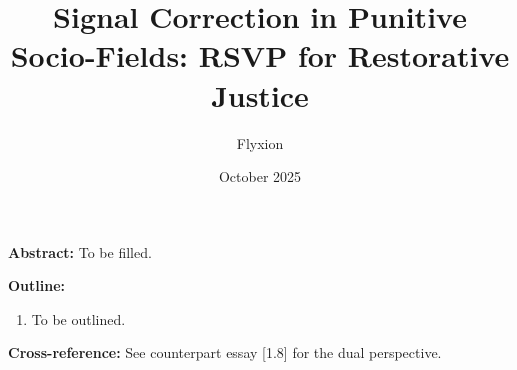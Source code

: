 \documentclass[12pt,a4paper]{article}
\title{Signal Correction in Punitive Socio-Fields: RSVP for Restorative Justice}
\author{Flyxion}
\date{October 2025}
\begin{document}
\maketitle
\textbf{Abstract:} To be filled.

\bigskip
\textbf{Outline:}
\begin{enumerate}
\item To be outlined.
\end{enumerate}

\bigskip
\textbf{Cross-reference:} See counterpart essay [1.8] for the dual perspective.
\end{document}
